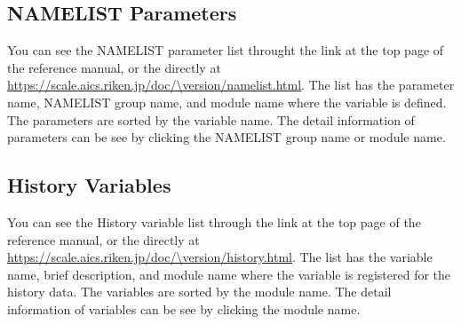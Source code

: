 \subsection{NAMELIST Parameters}
You can see the NAMELIST parameter list throught the link at the top page of the reference manual, or the directly at \url{https://scale.aics.riken.jp/doc/\version/namelist.html}.
The list has the parameter name, NAMELIST group name, and module name where the variable is defined.
The parameters are sorted by the variable name.
The detail information of parameters can be see by clicking the NAMELIST group name or module name.


\subsection{History Variables}
You can see the History variable list through the link at the top page of the reference manual, or the directly at \url{https://scale.aics.riken.jp/doc/\version/history.html}.
The list has the variable name, brief description, and module name where the variable is registered for the history data.
The variables are sorted by the module name.
The detail information of variables can be see by clicking the module name.
